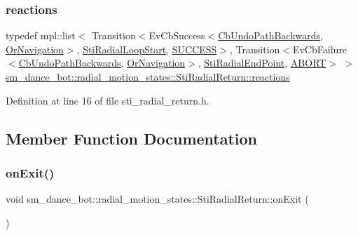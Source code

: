 \subsubsection{\texorpdfstring{reactions}{reactions}}
{\footnotesize\ttfamily typedef mpl\+::list$<$ Transition$<$Ev\+Cb\+Success$<$\hyperlink{classcl__move__base__z_1_1CbUndoPathBackwards}{Cb\+Undo\+Path\+Backwards}, \hyperlink{classsm__dance__bot_1_1OrNavigation}{Or\+Navigation}$>$, \hyperlink{structsm__dance__bot_1_1radial__motion__states_1_1StiRadialLoopStart}{Sti\+Radial\+Loop\+Start}, \hyperlink{structsmacc_1_1default__transition__tags_1_1SUCCESS}{S\+U\+C\+C\+E\+SS}$>$, Transition$<$Ev\+Cb\+Failure$<$\hyperlink{classcl__move__base__z_1_1CbUndoPathBackwards}{Cb\+Undo\+Path\+Backwards}, \hyperlink{classsm__dance__bot_1_1OrNavigation}{Or\+Navigation}$>$, \hyperlink{structsm__dance__bot_1_1radial__motion__states_1_1StiRadialEndPoint}{Sti\+Radial\+End\+Point}, \hyperlink{structsmacc_1_1default__transition__tags_1_1ABORT}{A\+B\+O\+RT}$>$ $>$ \hyperlink{structsm__dance__bot_1_1radial__motion__states_1_1StiRadialReturn_aa9de7333f73b75189f2693d4fa3f6d57}{sm\+\_\+dance\+\_\+bot\+::radial\+\_\+motion\+\_\+states\+::\+Sti\+Radial\+Return\+::reactions}}



Definition at line 16 of file sti\+\_\+radial\+\_\+return.\+h.



\subsection{Member Function Documentation}
\mbox{\label{structsm__dance__bot_1_1radial__motion__states_1_1StiRadialReturn_ab023b2869f4cdb182fd43bb81bc6dfd0}} 
\subsubsection{\texorpdfstring{on\+Exit()}{onExit()}}
{\footnotesize\ttfamily void sm\+\_\+dance\+\_\+bot\+::radial\+\_\+motion\+\_\+states\+::\+Sti\+Radial\+Return\+::on\+Exit (\begin{DoxyParamCaption}{ }\end{DoxyParamCaption})\hspace{0.3cm}{\ttfamily [inline]}}



